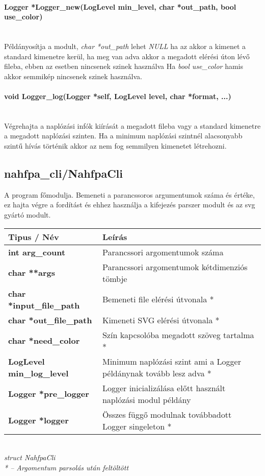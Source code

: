 \documentclass{article}[12pt,a4paper]
\newcommand{\fn}[1]{\paragraph{#1}\mbox{}\\}
\begin{document}
    \fn{Logger *Logger\_new(LogLevel min\_level, char *out\_path, bool use\_color)}
    Példányosítja a modult, \textit{char *out\_path} lehet \textit{NULL} ha az akkor a kimenet a standard kimenetre kerül, ha meg van adva akkor a megadott elérési úton lévő fileba, ebben az esetben nincsenek szinek használva
    Ha \textit{bool use\_color} hamis akkor semmikép nincsenek szinek használva.

    \fn{void Logger\_log(Logger *self, LogLevel level, char *format, ...)}
    Végrehajta a naplózási infók kiírását a megadott fileba vagy a standard kimenetre a megadott naplózási szinten.
    Ha a minimum naplózási szintnél alacsonyabb szintű hívás történik akkor az nem fog semmilyen kimenetet létrehozni.

    \subsection{nahfpa\_cli/NahfpaCli}
    A program főmodulja.
    Bemeneti a parancssoros argumentumok száma és értéke, ez hajta végre a fordítást és ehhez használja a kifejezés parszer modult és az svg gyártó modult.

    \begin{center}
        \begin{tabular}{ | p{5.5cm} || p{5.5cm} | }
            \hline
            \textbf{Tipus / Név} & Leírás \\
            \hline
            \textbf{int arg\_count} & Parancssori argomentumok száma\\
            \hline
            \textbf{char **args} & Parancssori argomentumok kétdimenziós tömbje\\
            \hline
            \textbf{char *input\_file\_path} & Bemeneti file elérési útvonala *\\
            \hline
            \textbf{char *out\_file\_path} & Kimeneti SVG elérési útvonala *\\
            \hline
            \textbf{char *need\_color} & Szín kapcsolóba megadott szöveg tartalma *\\
            \hline
            \textbf{LogLevel min\_log\_level} & Minimum naplózási szint ami a Logger példánynak tovább lesz adva *\\
            \hline
            \textbf{Logger *pre\_logger} & Logger inicializálása előtt használt naplózási modul példány\\
            \hline
            \textbf{Logger *logger} & Összes függő modulnak továbbadott Logger singeleton *\\
            \hline
        \end{tabular}\\
        \textit{struct NahfpaCli}\\
        \textit{* -- Argomentum parsolás után feltöltött}
    \end{center}
\end{document}
